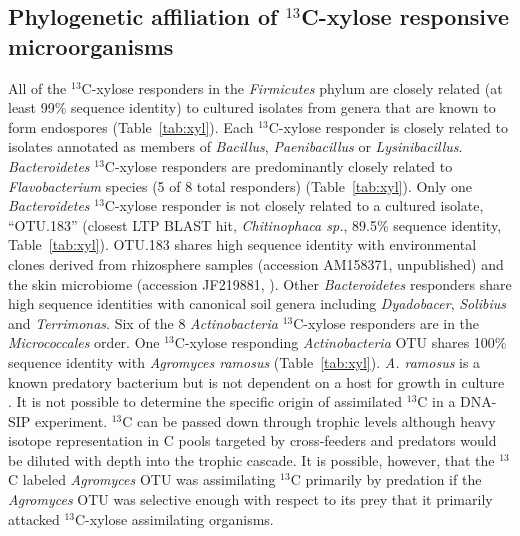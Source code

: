 \subsection{Phylogenetic affiliation of $^{13}$C-xylose responsive
microorganisms}
All of the $^{13}$C-xylose responders in the \textit{Firmicutes} phylum are
closely related (at least 99\% sequence identity) to cultured isolates from
genera that are known to form endospores (Table~\ref{tab:xyl}). Each
$^{13}$C-xylose responder is closely related to isolates annotated as members
of \textit{Bacillus}, \textit{Paenibacillus} or \textit{Lysinibacillus}.
\textit{Bacteroidetes} $^{13}$C-xylose responders are predominantly closely
related to \textit{Flavobacterium} species (5 of 8 total responders)
(Table~\ref{tab:xyl}).  Only one \textit{Bacteroidetes} $^{13}$C-xylose
responder is not closely related to a cultured isolate, ``OTU.183'' (closest
LTP BLAST hit, \textit{Chitinophaca sp.}, 89.5\% sequence identity,
Table~\ref{tab:xyl}). OTU.183 shares high sequence identity with environmental
clones derived from rhizosphere samples (accession AM158371, unpublished) and
the skin microbiome (accession JF219881, \citet{Kong_2012}). Other
\textit{Bacteroidetes} responders share high sequence identities with canonical
soil genera including \textit{Dyadobacer}, \textit{Solibius} and
\textit{Terrimonas}. Six of the 8 \textit{Actinobacteria} $^{13}$C-xylose
responders are in the \textit{Micrococcales} order. One $^{13}$C-xylose
responding \textit{Actinobacteria} OTU shares 100\% sequence identity with
\textit{Agromyces ramosus} (Table~\ref{tab:xyl}).  \textit{A. ramosus} is a
known predatory bacterium but is not dependent on a host for growth in culture
\citep{16346402}. It is not possible to determine the specific origin of
assimilated $^{13}$C in a DNA-SIP experiment. $^{13}$C can be passed down
through trophic levels although heavy isotope representation in C pools
targeted by cross-feeders and predators would be diluted with depth into the
trophic cascade. It is possible, however, that the $^{13}$C labeled
\textit{Agromyces} OTU was assimilating $^{13}$C primarily by predation if the
\textit{Agromyces} OTU was selective enough with respect to its prey that it
primarily attacked $^{13}$C-xylose assimilating organisms. 

